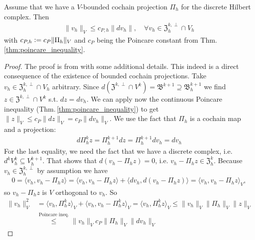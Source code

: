 \documentclass[../master_thesis.tex]{subfiles}
\begin{document}
\begin{proposition}
    Assume that we have a $V$-bounded cochain projection $\Pi_h$ for 
    the discrete Hilbert complex. Then 
    \begin{align*}
        \lVert v_h \rVert _V \leq c_{P,h}  \lVert dv_h \rVert, 
            \quad \forall v_h \in \mathfrak{Z}_h^{k,\perp}\cap V_h
    \end{align*}
    with $c_{P,h} \vcentcolon= c_{P} \lVert \Pi_h \rVert _V$  and $c_P$ being the Poincare constant from 
    Thm.\,\ref{thm:poincare_inequality}.
\end{proposition}
\begin{proof}
    The proof is from \cite[Thm.\,5.3]{arnold} with some additional details.
    This indeed is a direct consequence of the existence of bounded cochain projections.
    Take $v_h \in \mathfrak{Z}_h^{k,\perp}\cap V_h$ arbitrary. 
    Since $d (\mathfrak{Z}^{k,\perp} \cap V^k) = \mathfrak{B}^{k+1} \supseteq \mathfrak{B}^{k+1}_h$ we find 
    $z\in \mathfrak{Z}^{k,\perp}\cap V^k$ s.t. $dz = dv_h$. We can apply now the continuous 
    Poincare inequality (Thm.\,\ref{thm:poincare_inequality}) to get $\lVert z \rVert _V \leq c_P \lVert dz \rVert _V = c_P \lVert dv_h \rVert _V$.
    We use the fact that $\Pi_h$ is a cochain map 
    and a projection:
    \begin{align*}
        d\Pi^k_h z = \Pi^{k+1}_h dz = \Pi^{k+1}_h dv_h = dv_h
    \end{align*}
    For the last equality, we need the fact that we have a discrete complex, i.e. $d^k V^k_h \subseteq V^{k+1}_h$.
    That shows that $d(v_h - \Pi_h z) = 0$, i.e. $v_h - \Pi_h z \in \mathfrak{Z}_h^k$.
    Because $v_h \in \mathfrak{Z}_h^{k,\perp}$ by assumption we have 
    \begin{align*}
        0 = \langle v_h, v_h - \Pi_h z \rangle = \langle v_h, v_h - \Pi_h z \rangle + \langle dv_h, d(v_h - \Pi_h z) \rangle
            = \langle v_h, v_h - \Pi_h z \rangle _V,
    \end{align*}
    so $v_h - \Pi_h z$ is $V$ orthogonal to $v_h$. So 
    \begin{align*}
        \lVert v_h \rVert _V^2 &= \langle v_h, \Pi_h^k z \rangle _V + \langle v_h, v_h - \Pi_h^k z\rangle _V 
        = \langle v_h, \Pi_h^k z \rangle _V \leq \lVert v_h \rVert _V \lVert \Pi_h \rVert _V \lVert z \rVert _V
        \\ &\stackrel{\text{Poincare ineq.}}{\leq} \lVert v_h \rVert _V c_P \lVert \Pi_h \rVert _V 
            \lVert dv_h \rVert _V
    \end{align*}
\end{proof}
\end{document}
